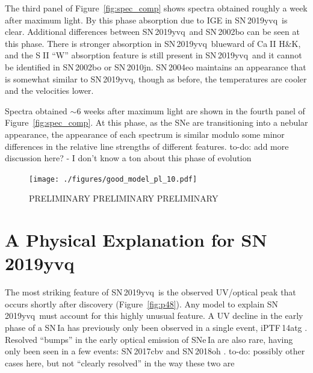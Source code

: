 \documentclass[twocolumn]{aastex63}
\def\ion#1#2{#1$\;${\footnotesize\rm{#2}}\relax}
\newcommand{\todo}[1]{{\color{magenta} to-do: {#1}}}
\newcommand{\sn}{SN\,2019yvq}
\begin{document}
The third panel of Figure~\ref{fig:spec_comp} shows spectra obtained roughly a
week after maximum light. By this phase absorption due to IGE in \sn\ is
clear. Additional differences between \sn\ and SN\,2002bo can be seen at this
phase. There is stronger absorption in \sn\ blueward of \ion{Ca}{II} H\&K, and
the \ion{S}{II} ``W'' absorption feature is still present in \sn\ and it
cannot be identified in SN\,2002bo or SN\,2010jn. SN\,2004eo maintains an
appearance that is somewhat similar to \sn, though as before, the temperatures
are cooler and the velocities lower.

Spectra obtained $\sim$6 weeks after maximum light are shown in the fourth
panel of Figure~\ref{fig:spec_comp}. At this phase, as the SNe are
transitioning into a nebular appearance, the appearance of each spectrum is
similar modulo some minor differences in the relative line strengths of
different features. \todo{add more discussion here? - I don't know a ton about
this phase of evolution}

\begin{figure}
    \centering
    \texttt{[image: ./figures/good\_model\_pl\_10.pdf]}
    \caption{PRELIMINARY PRELIMINARY PRELIMINARY}
    \label{fig:tardis}
\end{figure}



\section{A Physical Explanation for \sn}\label{sec:models}

The most striking feature of \sn\ is the observed UV/optical peak that occurs
shortly after discovery (Figure~\ref{fig:p48}). Any model to explain \sn\ must
account for this highly unusual feature. A UV decline in the early phase of a
SN\,Ia has previously only been observed in a single event, iPTF\,14atg
\citep{Cao15}. Resolved ``bumps'' in the early optical emission of SNe\,Ia are
also rare, having only been seen in a few events: SN\,2017cbv
\citep{Hosseinzadeh17} and SN\,2018oh \citep{Shappee19,Dimitriadis19}.
\todo{possibly other cases here, but not ``clearly resolved'' in the way these
two are}
\end{document}
